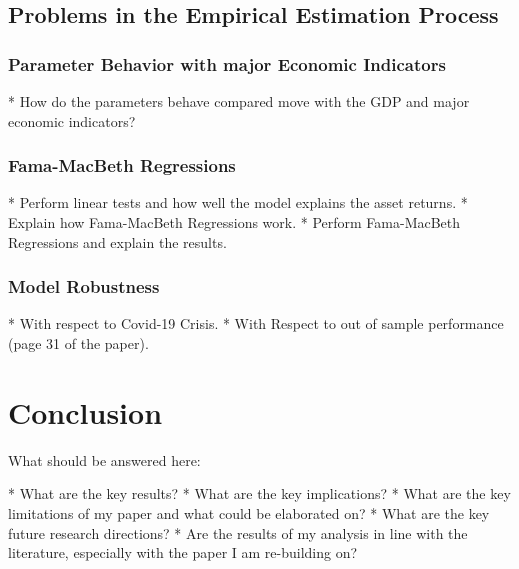 \documentclass[12pt,a4paper]{article}
\begin{document}
	\subsection{Problems in the Empirical Estimation Process}

		\subsubsection{Parameter Behavior with major Economic Indicators} 

		* How do the parameters behave compared move with the GDP and major economic indicators?

		\subsubsection{Fama-MacBeth Regressions}

		* Perform linear tests and how well the model explains the asset returns.
		* Explain how Fama-MacBeth Regressions work.
		* Perform Fama-MacBeth Regressions and explain the results.




		\subsubsection{Model Robustness}

		* With respect to Covid-19 Crisis.
		* With Respect to out of sample performance (page 31 of the paper).


\section{Conclusion}

What should be answered here:

* What are the key results?
* What are the key implications?
* What are the key limitations of my paper and what could be elaborated on?
* What are the key future research directions?
* Are the results of my analysis in line with the literature, especially with the paper I am re-building on?

		
		
		

\newpage
\end{document}
